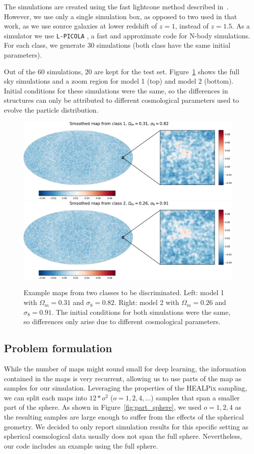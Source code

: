\documentclass[final,twocolumn,3p,times,authoryear]{elsarticle}
\newcommand{\nati}[1]{{\color[rgb]{.1,.6,.1}{#1}}}
\newcommand{\figref}[1]{Figure~\ref{fig:#1}}
\newcommand{\1}{\b{1}}              %
\newcommand{\0}{\b{0}}              %
\newcommand{\pkg}[1]{\texttt{#1}}
\begin{document}
The simulations are created using the fast lightcone method described in~\citep{sgier2018fastgeneration}.
However, we use only a single simulation box, as opposed to two used in that work, as we use source galaxies at lower redshift of $z=1$, instead of $z=1.5$.
As a simulator we use \pkg{L-PICOLA} \citep{howlett2015lpicola}, a fast and approximate code for N-body simulations.
For each class, we generate $30$ simulations (both class have the same initial parameters).

Out of the $60$ simulations, $20$ are kept for the test set.
\figref{map_sample} shows the full sky simulations and a zoom region for model 1 (top) and model 2 (bottom).
Initial conditions for these simulations were the same, so the differences in structures can only be attributed to different cosmological parameters used to evolve the particle distribution.

\begin{figure}[!ht]
\centering
\includegraphics[width=0.48\linewidth]{smooth_map_class_1}
\hfill
\includegraphics[width=0.48\linewidth]{smooth_map_class_2}
\caption{Example maps from two classes to be discriminated. Left: model 1 with $\Omega_m=0.31$ and $\sigma_8=0.82$. Right: model 2 with $\Omega_m=0.26$ and $\sigma_8=0.91$.
The initial conditions for both simulations were the same, so differences only arise due to different cosmological parameters. \nati{Tomek: Is this correct?}}
\label{fig:map_sample}
\end{figure}



\subsection{Problem formulation}
While the number of maps might sound small for deep learning, the information contained in the maps is very recurrent, allowing us to use parts of the map as samples for our simulation.
Leveraging the properties of the HEALPix sampling, we can split each maps
into $12*o^2$ ($o=1,2,4,\dots$) samples that span a smaller part of the sphere.
As shown in \figref{part_sphere}, we used $o=1,2,4$ as the resulting
samples are large enough to suffer from the effects of the spherical geometry. We
decided to only report simulation results for this specific setting as spherical
cosmological data usually does not span the full sphere. Nevertheless, our code
includes an example using the full sphere.
\end{document}
